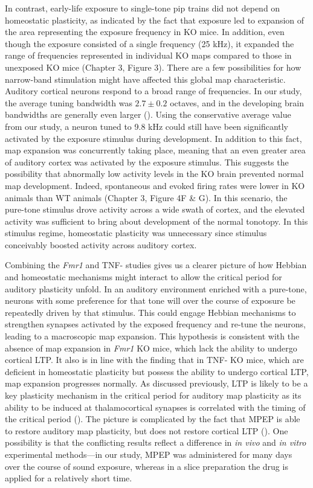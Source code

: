 In contrast, early-life exposure to single-tone pip trains did not depend on homeostatic plasticity, as indicated by the fact that exposure led to expansion of the area representing the exposure frequency in KO mice. In addition, even though the exposure consisted of a single frequency (25 kHz), it expanded the range of frequencies represented in individual KO maps compared to those in unexposed KO mice (Chapter 3, Figure 3). There are a few possibilities for how narrow-band stimulation might have affected this global map characteristic. Auditory cortical neurons respond to a broad range of frequencies. In our study, the average tuning bandwidth was $2.7\pm0.2$ octaves, and in the developing brain bandwidths are generally even larger (\cite{Zhang2001}). Using the conservative average value from our study, a neuron tuned to 9.8 kHz could still have been significantly activated by the exposure stimulus during development. In addition to this fact, map expansion was concurrently taking place, meaning that an even greater area of auditory cortex was activated by the exposure stimulus. This suggests the possibility that abnormally low activity levels in the KO brain prevented normal map development. Indeed, spontaneous and evoked firing rates were lower in KO animals than WT animals (Chapter 3, Figure 4F \& G). In this scenario, the pure-tone stimulus drove activity across a wide swath of cortex, and the elevated activity was sufficient to bring about development of the normal tonotopy. In this stimulus regime, homeostatic plasticity was unnecessary since stimulus conceivably boosted activity across auditory cortex.

Combining the \textit{Fmr1} and TNF-\textalpha{} studies gives us a clearer picture of how Hebbian and homeostatic mechanisms might interact to allow the critical period for auditory plasticity unfold. In an auditory environment enriched with a pure-tone, neurons with some preference for that tone will over the course of exposure be repeatedly driven by that stimulus. This could engage Hebbian mechanisms to strengthen synapses activated by the exposed frequency and re-tune the neurons, leading to a macroscopic map expansion. This hypothesis is consistent with the absence of map expansion in \textit{Fmr1} KO mice, which lack the ability to undergo cortical LTP. It also is in line with the finding that in TNF-\textalpha{} KO mice, which are deficient in homeostatic plasticity but possess the ability to undergo cortical LTP, map expansion progresses normally. As discussed previously, LTP is likely to be a key plasticity mechanism in the critical period for auditory map plasticity as its ability to be induced at thalamocortical synapses is correlated with the timing of the critical period (\cite{Chun2013}). The picture is complicated by the fact that MPEP is able to restore auditory map plasticity, but does not restore cortical LTP (\cite{Wilson2007}). One possibility is that the conflicting results reflect a difference in \textit{in vivo} and \textit{in vitro} experimental methods---in our study, MPEP was administered for many days over the course of sound exposure, whereas in a slice preparation the drug is applied for a relatively short time.

